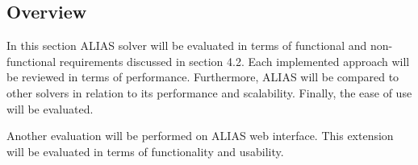 \subsection{Overview}
In this section ALIAS solver will be evaluated in terms of functional and non-functional requirements discussed in section 4.2. Each implemented approach will be reviewed in terms of performance. Furthermore, ALIAS will be compared to other solvers in relation to its performance and scalability. Finally, the ease of use will be evaluated.

Another evaluation will be performed on ALIAS web interface. This extension will be evaluated in terms of functionality and usability. 